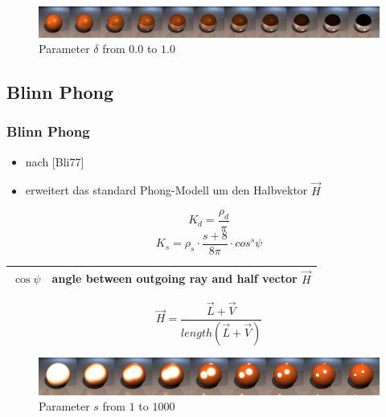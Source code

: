 \documentclass[11pt]{beamer}
\begin{document}
\begin{frame}[allowframebreaks]
\begin{figure}[H]
\includegraphics[width=\textwidth]{../phongreflcomplete}
\caption{Parameter $\delta$ from $0.0$ to $1.0$}
\end{figure}

\end{frame}



\subsection{Blinn Phong}
\begin{frame}[allowframebreaks]
\frametitle{Blinn Phong}
\begin{itemize}
\item nach [Bli77]
\item erweitert das standard Phong-Modell um den Halbvektor $\vec{H}$
\end{itemize}

\begin{equation}
K_d = \frac{\rho_d}{\pi}
\end{equation}
\begin{equation}
K_s = \rho_s \cdot \frac{s+8}{8\pi} \cdot cos^s\psi
\end{equation}

\begin{table}[H]
\begin{tabular}{| c | l |}
\hline
$\cos\psi$ & angle between outgoing ray and half vector $\vec{H}$\\ \hline
\end{tabular}
\end{table}
\begin{equation}
\vec{H} = \frac{\vec{L}+\vec{V}}{length(\vec{L}+\vec{V})}
\end{equation}

\begin{figure}[H]
\includegraphics[width=\textwidth]{../blinnphongshinecomplete}
\caption{Parameter $s$ from $1$ to $1000$}
\end{figure}

\end{frame}
\end{document}
